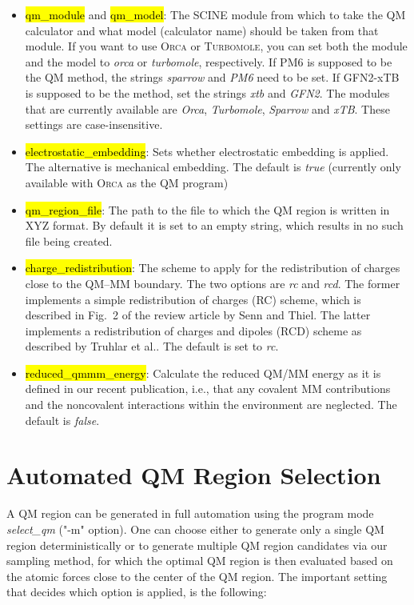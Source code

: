 \documentclass[]{tufte-book}
\begin{document}
{{\begin{itemize}
\item \hl{qm\_module} and \hl{qm\_model}: The SCINE module from which to take the QM calculator and what model (calculator name) should be taken from that module. If you want to use \textsc{Orca} or \textsc{Turbomole}, you can set both the module and the model to \textit{orca} or \textit{turbomole}, respectively. If PM6 is supposed to be the QM method, the strings \textit{sparrow} and \textit{PM6} need to be set. If GFN2-xTB is supposed to be the method, set the strings \textit{xtb} and \textit{GFN2}. The modules that are currently available are \textit{Orca}, \textit{Turbomole}, \textit{Sparrow} and \textit{xTB}. These settings are case-insensitive.
\item \hl{electrostatic\_embedding}: Sets whether electrostatic embedding is applied. The alternative is mechanical embedding. The default is \textit{true} (currently only available with \textsc{Orca} as the QM program)
\item \hl{qm\_region\_file}: The path to the file to which the QM region is written in XYZ format. By default it is set to an empty string, which results in no such file being created.
\item \hl{charge\_redistribution}: The scheme to apply for the redistribution of charges close to the QM--MM boundary. The two options are \textit{rc} and \textit{rcd}. The former implements a simple redistribution of charges (RC) scheme, which is described in Fig.~2 of the review article by Senn and Thiel\cite{senn09}. The latter implements a redistribution of charges and dipoles (RCD) scheme as described by Truhlar et al.\cite{lin05}. The default is set to \textit{rc}.
\item \hl{reduced\_qmmm\_energy}: Calculate the reduced QM/MM energy as it is defined in our recent publication\cite{brunken21}, i.e., that any covalent MM contributions and the noncovalent interactions
within the environment are neglected. The default is \textit{false}.

\end{itemize}


\chapter{Automated QM Region Selection}

A QM region can be generated in full automation using the program mode \textit{select\_qm} ("-m" option). One can choose either to generate only a single QM region deterministically or to generate multiple QM region candidates via our sampling method, for which the optimal QM region is then evaluated based on the atomic forces close to the center of the QM region.\cite{brunken21} The important setting that decides which option is applied, is the following:

}}
\end{document}
